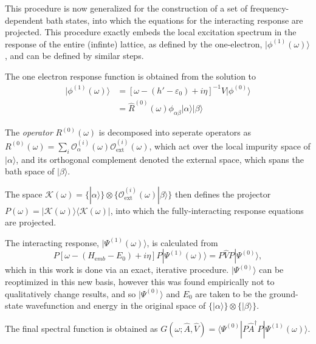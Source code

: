 \documentclass[aps,showpacs,twocolumn,nobibnotes]{revtex4}
\begin{document}
This procedure is now generalized for the construction of a set of frequency-dependent bath states, into which the
equations for the interacting response are projected. This procedure exactly embeds the local excitation spectrum in the response of the entire (infinte) lattice, 
as defined by the one-electron, $|\phi^{(1)}(\omega) \rangle$, and can be defined by similar steps.
\begin{inparaenum}
\item The one electron response function is obtained from the solution to
\begin{eqnarray}
|\phi^{(1)}(\omega) \rangle &= \left[ \omega-(h'-\varepsilon_0)+i\eta \right]^{-1} {\hat V} |\phi^{(0)}\rangle  \nonumber \\ 
                            &= {\hat R^{(0)}}(\omega) \phi_{\alpha \beta} |\alpha \rangle |\beta \rangle 
\end{eqnarray}
\item The {\em operator} $R^{(0)}(\omega)$ is decomposed into seperate operators as $R^{(0)}(\omega) = \sum_i \mathcal{O}^{(i)}_{\alpha}(\omega) \mathcal{O}^{(i)}_{\mathrm{ext}}(\omega)$, 
which act over the local impurity space of $|\alpha \rangle$, and its orthogonal complement denoted the external space, which spans the bath space of $|\beta\rangle$.
\item The space $\mathcal{K}(\omega) = \{ |\alpha \rangle \} \otimes \{ \mathcal{O}_{\mathrm{ext}}^{(i)}(\omega) | \beta \rangle \}$ then defines the projector $P(\omega) = |\mathcal{K}(\omega)\rangle \langle \mathcal{K}(\omega) |$, into which the fully-interacting response equations are projected.
\item The interacting response, $|\Psi^{(1)} (\omega) \rangle$, is calculated from
\begin{equation}
    P \left[ \omega - (H_{\mathrm emb}-E_0) + i \eta \right] P | \Psi^{(1)}(\omega) \rangle = P {\hat V} P |\Psi^{(0)} \rangle   ,   \label{eqn:ExactResponse}
\end{equation}
which in this work is done via an exact, iterative procedure\cite{}.
$|\Psi^{(0)} \rangle$ can be reoptimized in this new basis, however this was found empirically not to qualitatively change results, and 
so $|\Psi^{(0)}\rangle$ and $E_0$ are taken to be the ground-state wavefunction and energy in the 
original space of $\{ | \alpha \rangle \} \otimes \{ | \beta \rangle \}$.
\item The final spectral function is obtained as $G(\omega; \hat{A}, \hat{V}) = \langle \Psi^{(0)} | P \hat{A}^{\dagger} P | \Psi^{(1)}(\omega) \rangle$.
\end{inparaenum}
\end{document}
